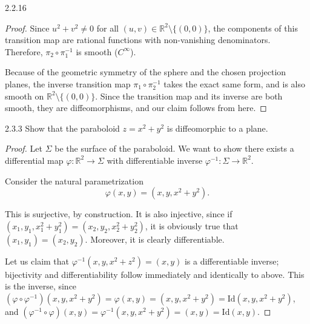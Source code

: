 \documentclass[11pt]{article}
\begin{document}
\begin{problem}{2.2.16}
\begin{enumerate}[label=(\alph*)]
\begin{proof}
            Since \( u^2 + v^2 \neq 0 \) for all \( (u,v) \in \mathbb{R}^2 \setminus \{(0,0)\} \), the components of this transition map are rational functions with non-vanishing denominators.
            Therefore, \( \pi_2 \circ \pi_1^{-1} \) is smooth (\( C^\infty \)).

            Because of the geometric symmetry of the sphere and the chosen projection planes, the inverse transition map \( \pi_1 \circ \pi_2^{-1} \) takes the exact same form, and is also smooth on \( \mathbb{R}^2 \setminus \{(0,0)\} \).
            Since the transition map and its inverse are both smooth, they are diffeomorphisms, and our claim follows from here.
          \end{proof}
	\end{enumerate}
\end{problem}

\begin{problem}{2.3.3}
	Show that the paraboloid \( z = x^2 + y^2 \) is diffeomorphic to a plane.
\end{problem}
\begin{proof}
Let \( \Sigma \) be the surface of the paraboloid.
We want to show there exists a differential map \( \varphi: \mathbb{R}^2 \rightarrow \Sigma \) with differentiable inverse \( \varphi^{-1}: \Sigma \rightarrow \mathbb{R}^2 \).

Consider the natural parametrization
\begin{equation}
\label{eq:15}
\varphi(x,y) = (x, y, x^2 + y^2).
\end{equation}

This is surjective, by construction.
It is also injective, since if \( (x_1, y_1, x_1^2 + y_1^2) = (x_2, y_2, x_2^2 + y_2^2) \), it is obviously true that \( (x_1, y_1) = (x_2, y_2) \).
Moreover, it is clearly differentiable.

Let us claim that \( \varphi^{-1}(x, y, x^2 + z^2) = (x, y) \) is a differentiable inverse; bijectivity and differentiability follow immediately and identically to above.
This is the inverse, since
\((\varphi \circ \varphi^{-1})(x,y, x^2 + y^2) = \varphi(x,y) = (x, y, x^2 + y^2) = \text{Id}(x, y, x^2 + y^2) \), and \( (\varphi^{-1} \circ \varphi)(x,y) = \varphi^{-1}(x, y, x^2 + y^2) = (x, y) = \text{Id}(x, y) \).
\end{proof}
\end{document}
